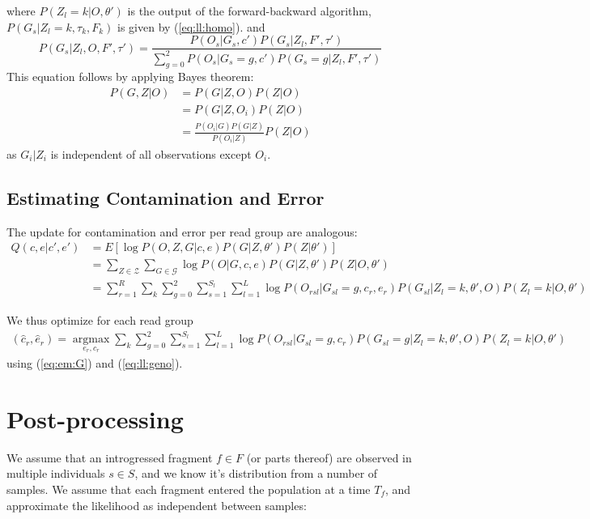 \documentclass[10pt,a4paper]{article}
\begin{document}
where $P(Z_l = k |O, \theta')$ is the output of the forward-backward algorithm, $P(G_s | Z_l=k, \tau_k, F_k)$ is given by (\ref{eq:ll:homo}).   and
\begin{equation}
P(G_s | Z_l, O, F', \tau') = \frac{P(O_s | G_s, c') P(G_s | Z_l, F', \tau')}{ \sum_{g=0}^2 P(O_s | G_s=g, c') P(G_s=g | Z_l, F', \tau') }
\label{eq:em:G}
\end{equation}
This equation follows by applying Bayes theorem: 
\begin{align}
P(G,Z| O) &= P(G|Z, O)P(Z|O)\nonumber\\
&=P(G | Z, O_i) P(Z | O)\nonumber\\
&= \frac{P(O_i | G) P(G|Z)}{P(O_i | Z)} P(Z|O)
\end{align}
as $G_i | Z_i$ is independent of all observations except $O_i$.




\subsection{Estimating Contamination and Error}
The update for contamination and error per read group are analogous:
\begin{align}
Q(c, e|c', e' )&= E[\log P(O, Z, G|c, e )  P(G|Z, \theta') P(Z | \theta')]\nonumber\\
&=\sum_{Z \in \mathcal{Z}}\sum_{G \in \mathcal{G}} \log P( O | G, c, e) P(G|Z, \theta') P(Z | O, \theta')\nonumber\\
&=\sum_{r=1}^R\sum_k\sum_{g=0}^2 \sum_{s=1}^{S_l}\sum_{l=1}^L \log P(O_{rsl} | G_{sl}=g, c_r, e_r)  P(G_{sl}|Z_l=k, \theta', O) P(Z_l=k | O, \theta')
\end{align}

We thus optimize for each read group
\begin{align}
(\hat{c}_r, \hat{e}_r) = \operatorname*{argmax}_{e_r, c_r}\sum_k\sum_{g=0}^2 \sum_{s=1}^{S_l}\sum_{l=1}^L \log P(O_{rsl} | G_{sl}=g, c_r)  P(G_{sl}=g|Z_l=k, \theta', O) P(Z_l=k | O, \theta')
\end{align}
using (\ref{eq:em:G}) and (\ref{eq:ll:geno}).

\section{Post-processing}
We assume that an introgressed fragment $f \in F$ (or parts thereof) are observed in multiple individuals $s \in S$, and we know it's distribution from a number of samples. We assume that each fragment entered the population at a time $T_f$, and approximate the likelihood as independent between samples:
\end{document}
